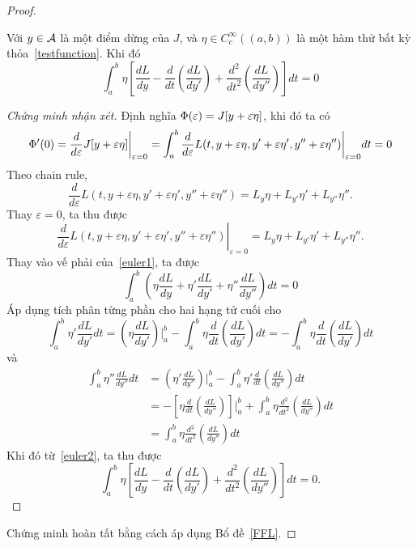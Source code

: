 ﻿\documentclass[12pt]{article}
\begin{document}
\begin{proof}
    \begin{claim}Với $y \in \mathcal{A}$ là một điểm dừng của $J$, và $\eta \in C_c^\infty((a, b))$ là một hàm thử bất kỳ thỏa~\eqref{testfunction}. Khi đó
            \[ \int_a^b \eta\left[\frac{dL}{dy} - \frac{d}{dt}\left(\frac{dL}{dy'}\right) + \frac{d^2}{dt^2}\left(\frac{dL}{dy''}\right)\right] dt = 0
 \]
    \end{claim}
    \begin{proof}[Chứng minh nhận xét] Định nghĩa $\Phi(\varepsilon) = J[y + \varepsilon\eta]$, khi đó ta có
    \begin{equation}\label{euler1}
 \Phi'(0) = \frac{d}{d\varepsilon}J[y + \varepsilon\eta]\bigg|_{\varepsilon = 0} = \int_a^b \frac{d}{d\varepsilon} L(t, y + \varepsilon\eta, y' + \varepsilon\eta', y'' + \varepsilon\eta'')\bigg|_{\varepsilon = 0}dt = 0
 \end{equation}
    Theo chain rule,
    \[
 \frac{d}{d\varepsilon} L(t, y + \varepsilon\eta, y' + \varepsilon\eta', y'' + \varepsilon\eta'') = L_y\eta + L_{y'}\eta' + L_{y''}\eta''.
 \]
    Thay $\varepsilon = 0$, ta thu được
    \[
 \left. \frac{d}{d\varepsilon} L(t, y + \varepsilon\eta, y' + \varepsilon\eta', y'' + \varepsilon\eta'') \right|_{\varepsilon = 0} = L_y\eta + L_{y'}\eta' + L_{y''}\eta''.
 \]
     Thay vào vế phải của~\eqref{euler1}, ta được
    \begin{equation}\label{euler2} \int_a^b \left( \eta\frac{dL}{dy} + \eta'\frac{dL}{dy'} + \eta''\frac{dL}{dy''}\right)dt = 0
 \end{equation}
    Áp dụng tích phân từng phần cho hai hạng tử cuối cho
    \[ \int_a^b \eta'\frac{dL}{dy'} dt = \left( \eta \frac{dL}{dy'}\right)\bigg|_a^b - \int_a^b \eta \frac{d}{dt}\left(\frac{dL}{dy'}\right)dt = - \int_a^b \eta \frac{d}{dt}\left(\frac{dL}{dy'}\right)dt
 \]
    và
    \begin{align*} \int_a^b \eta'' \frac{dL}{dy''}dt & = \left( \eta' \frac{dL}{dy''}\right)\bigg|_a^b - \int_a^b \eta' \frac{d}{dt}\left(\frac{dL}{dy''}\right)dt\\
 & = -\left[ \eta \frac{d}{dt}\left(\frac{dL}{dy''}\right)\right]\bigg|_a^b + \int_a^b \eta \frac{d^2}{dt^2}\left(\frac{dL}{dy''}\right)dt\\
 & = \int_a^b \eta \frac{d^2}{dt^2}\left(\frac{dL}{dy''}\right)dt
 \end{align*}
    Khi đó từ~\eqref{euler2}, ta thu được
    \[ \int_a^b \eta\left[\frac{dL}{dy} - \frac{d}{dt}\left(\frac{dL}{dy'}\right) + \frac{d^2}{dt^2}\left(\frac{dL}{dy''}\right)\right] dt = 0.
 \]
    \end{proof}
    Chứng minh hoàn tất bằng cách áp dụng Bổ đề~\ref{FFL}.
\end{proof}
\end{document}
